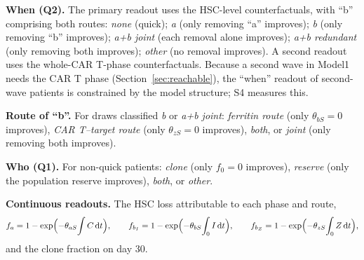 \documentclass[11pt]{article}
\newcommand{\dd}{\mathrm{d}}
\begin{document}
\textbf{When (Q2).} The primary readout uses the HSC-level counterfactuals, with ``b'' comprising both routes: \emph{none} (quick); \emph{a} (only removing ``a'' improves); \emph{b} (only removing ``b'' improves); \emph{a+b joint} (each removal alone improves); \emph{a+b redundant} (only removing both improves); \emph{other} (no removal improves). A second readout uses the whole-CAR T-phase counterfactuals. Because a second wave in Model1 needs the CAR T phase (Section~\ref{sec:reachable}), the ``when'' readout of second-wave patients is constrained by the model structure; S4 measures this.

\textbf{Route of ``b''.} For draws classified \emph{b} or \emph{a+b joint}: \emph{ferritin route} (only $\theta_{bS}=0$ improves), \emph{CAR T--target route} (only $\theta_{zS}=0$ improves), \emph{both}, or \emph{joint} (only removing both improves).

\textbf{Who (Q1).} For non-quick patients: \emph{clone} (only $f_0=0$ improves), \emph{reserve} (only the population reserve improves), \emph{both}, or \emph{other}.

\textbf{Continuous readouts.} The HSC loss attributable to each phase and route,
\begin{equation}
f_a = 1-\exp\Bigl(-\theta_{aS}\!\int C\,\dd t\Bigr),\qquad f_{b_I} = 1-\exp\Bigl(-\theta_{bS}\!\int_0 I\,\dd t\Bigr),\qquad f_{b_Z} = 1-\exp\Bigl(-\theta_{zS}\!\int_0 Z\,\dd t\Bigr),
\end{equation}
and the clone fraction on day 30.

\end{document}
